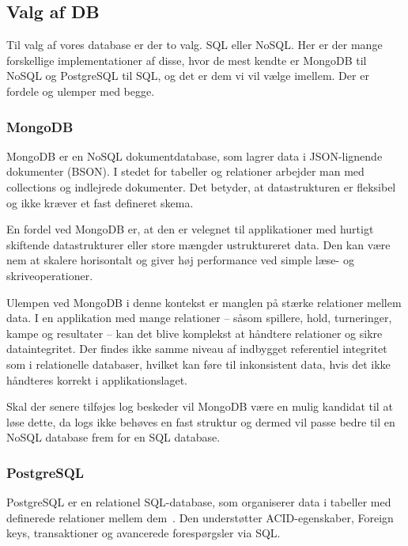 \subsection{Valg af DB}

    Til valg af vores database er der to valg. SQL eller NoSQL. Her er der mange forskellige implementationer af disse,
    hvor de mest kendte er MongoDB til NoSQL og PostgreSQL til SQL, og det er dem vi vil vælge imellem. Der er fordele og
    ulemper med begge.

    \subsubsection{MongoDB}

    MongoDB er en NoSQL dokumentdatabase, som lagrer data i JSON-lignende dokumenter (BSON).
    I stedet for tabeller og relationer arbejder man med collections og indlejrede dokumenter.
    Det betyder, at datastrukturen er fleksibel og ikke kræver et fast defineret skema.

    En fordel ved MongoDB er, at den er velegnet til applikationer med hurtigt skiftende
    datastrukturer eller store mængder ustruktureret data. Den kan være nem at skalere
    horisontalt og giver høj performance ved simple læse- og skriveoperationer.

    Ulempen ved MongoDB i denne kontekst er manglen på stærke relationer mellem data.
    I en applikation med mange relationer – såsom spillere, hold, turneringer, kampe og resultater –
    kan det blive komplekst at håndtere relationer og sikre dataintegritet.
    Der findes ikke samme niveau af indbygget referentiel integritet som i relationelle databaser,
    hvilket kan føre til inkonsistent data, hvis det ikke håndteres korrekt i applikationslaget.

    Skal der senere tilføjes log beskeder vil MongoDB være en mulig kandidat til at løse dette,
    da logs ikke behøves en fast struktur og dermed vil passe bedre til en NoSQL database frem for
    en SQL database.

    \subsubsection{PostgreSQL}

    PostgreSQL er en relationel SQL-database, som organiserer data i tabeller med
    definerede relationer mellem dem~\cite{postgres_docs2026}.
    Den understøtter ACID-egenskaber, Foreign keys, transaktioner og avancerede forespørgsler via SQL.

